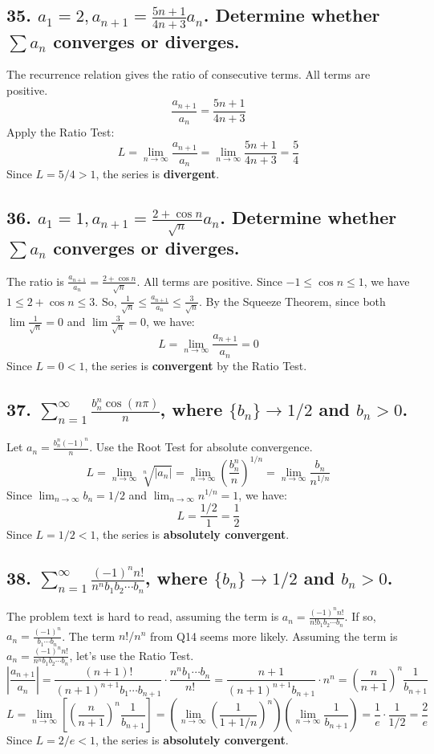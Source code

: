 \documentclass{article}
\begin{document}
\subsection*{35. $a_1=2, a_{n+1}=\frac{5n+1}{4n+3}a_n$. Determine whether $\sum a_n$ converges or diverges.}
The recurrence relation gives the ratio of consecutive terms. All terms are positive.
\[ \frac{a_{n+1}}{a_n} = \frac{5n+1}{4n+3} \]
Apply the Ratio Test:
\[ L = \lim_{n \to \infty} \frac{a_{n+1}}{a_n} = \lim_{n \to \infty} \frac{5n+1}{4n+3} = \frac{5}{4} \]
Since $L = 5/4 > 1$, the series is \textbf{divergent}.

\subsection*{36. $a_1=1, a_{n+1}=\frac{2+\cos n}{\sqrt{n}}a_n$. Determine whether $\sum a_n$ converges or diverges.}
The ratio is $\frac{a_{n+1}}{a_n} = \frac{2+\cos n}{\sqrt{n}}$. All terms are positive.
Since $-1 \le \cos n \le 1$, we have $1 \le 2+\cos n \le 3$.
So, $\frac{1}{\sqrt{n}} \le \frac{a_{n+1}}{a_n} \le \frac{3}{\sqrt{n}}$.
By the Squeeze Theorem, since both $\lim \frac{1}{\sqrt{n}} = 0$ and $\lim \frac{3}{\sqrt{n}} = 0$, we have:
\[ L = \lim_{n \to \infty} \frac{a_{n+1}}{a_n} = 0 \]
Since $L = 0 < 1$, the series is \textbf{convergent} by the Ratio Test.

\subsection*{37. $\sum_{n=1}^\infty \frac{b_n^n \cos(n\pi)}{n}$, where $\{b_n\} \to 1/2$ and $b_n > 0$.}
Let $a_n = \frac{b_n^n (-1)^n}{n}$. Use the Root Test for absolute convergence.
\[ L = \lim_{n \to \infty} \sqrt[n]{|a_n|} = \lim_{n \to \infty} \left( \frac{b_n^n}{n} \right)^{1/n} = \lim_{n \to \infty} \frac{b_n}{n^{1/n}} \]
Since $\lim_{n \to \infty} b_n = 1/2$ and $\lim_{n \to \infty} n^{1/n} = 1$, we have:
\[ L = \frac{1/2}{1} = \frac{1}{2} \]
Since $L = 1/2 < 1$, the series is \textbf{absolutely convergent}.

\subsection*{38. $\sum_{n=1}^\infty \frac{(-1)^n n!}{n^n b_1 b_2 \cdots b_n}$, where $\{b_n\} \to 1/2$ and $b_n > 0$.}
The problem text is hard to read, assuming the term is $a_n = \frac{(-1)^n n!}{n! b_1 b_2 \cdots b_n}$. If so, $a_n = \frac{(-1)^n}{b_1 \cdots b_n}$. The term $n!/n^n$ from Q14 seems more likely. Assuming the term is $a_n = \frac{(-1)^n n!}{n^n b_1 b_2 \cdots b_n}$, let's use the Ratio Test.
\[ \left|\frac{a_{n+1}}{a_n}\right| = \frac{(n+1)!}{(n+1)^{n+1} b_1 \cdots b_{n+1}} \cdot \frac{n^n b_1 \cdots b_n}{n!} = \frac{n+1}{(n+1)^{n+1} b_{n+1}} \cdot n^n = \left(\frac{n}{n+1}\right)^n \frac{1}{b_{n+1}} \]
\[ L = \lim_{n \to \infty} \left[ \left(\frac{n}{n+1}\right)^n \frac{1}{b_{n+1}} \right] = \left(\lim_{n \to \infty} \left(\frac{1}{1+1/n}\right)^n\right) \left(\lim_{n \to \infty} \frac{1}{b_{n+1}}\right) = \frac{1}{e} \cdot \frac{1}{1/2} = \frac{2}{e} \]
Since $L = 2/e < 1$, the series is \textbf{absolutely convergent}.
\end{document}

